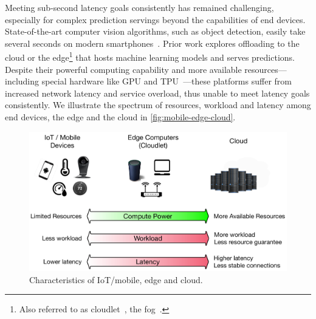 

Meeting sub-second latency goals consistently has remained challenging,
especially for complex prediction servings beyond the capabilities of end
devices. State-of-the-art computer vision algorithms, such as object detection,
easily take several seconds on modern smartphones~\cite{chen2015glimpse}. Prior
work explores offloading to the cloud or the edge\footnote{Also referred to as
  cloudlet~\cite{satyanarayanan2009case}, the fog~\cite{bonomi2012fog}.}  that
hosts machine learning models and serves predictions. Despite their powerful
computing capability and more available resources---including special hardware
like GPU and TPU~\cite{jouppi2017datacenter}---these platforms suffer from
increased network latency and service overload, thus unable to meet latency
goals consistently. We illustrate the spectrum of resources, workload and
latency among end devices, the edge and the cloud in
\autoref{fig:mobile-edge-cloud}.


\begin{figure}
  \centering
  \includegraphics[width=0.95\columnwidth]{figures/background.pdf}
  \caption{Characteristics of IoT/mobile, edge and cloud.}
  \label{fig:mobile-edge-cloud}
\end{figure}

